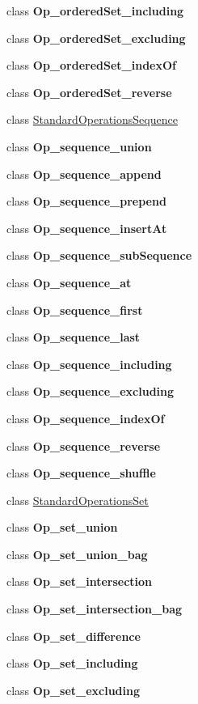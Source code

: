 \begin{DoxyCompactItemize}
class {\bfseries Op\-\_\-ordered\-Set\-\_\-including}
\item 
class {\bfseries Op\-\_\-ordered\-Set\-\_\-excluding}
\item 
class {\bfseries Op\-\_\-ordered\-Set\-\_\-index\-Of}
\item 
class {\bfseries Op\-\_\-ordered\-Set\-\_\-reverse}
\item 
class \hyperlink{classorg_1_1tzi_1_1use_1_1uml_1_1ocl_1_1expr_1_1operations_1_1_standard_operations_sequence}{Standard\-Operations\-Sequence}
\item 
class {\bfseries Op\-\_\-sequence\-\_\-union}
\item 
class {\bfseries Op\-\_\-sequence\-\_\-append}
\item 
class {\bfseries Op\-\_\-sequence\-\_\-prepend}
\item 
class {\bfseries Op\-\_\-sequence\-\_\-insert\-At}
\item 
class {\bfseries Op\-\_\-sequence\-\_\-sub\-Sequence}
\item 
class {\bfseries Op\-\_\-sequence\-\_\-at}
\item 
class {\bfseries Op\-\_\-sequence\-\_\-first}
\item 
class {\bfseries Op\-\_\-sequence\-\_\-last}
\item 
class {\bfseries Op\-\_\-sequence\-\_\-including}
\item 
class {\bfseries Op\-\_\-sequence\-\_\-excluding}
\item 
class {\bfseries Op\-\_\-sequence\-\_\-index\-Of}
\item 
class {\bfseries Op\-\_\-sequence\-\_\-reverse}
\item 
class {\bfseries Op\-\_\-sequence\-\_\-shuffle}
\item 
class \hyperlink{classorg_1_1tzi_1_1use_1_1uml_1_1ocl_1_1expr_1_1operations_1_1_standard_operations_set}{Standard\-Operations\-Set}
\item 
class {\bfseries Op\-\_\-set\-\_\-union}
\item 
class {\bfseries Op\-\_\-set\-\_\-union\-\_\-bag}
\item 
class {\bfseries Op\-\_\-set\-\_\-intersection}
\item 
class {\bfseries Op\-\_\-set\-\_\-intersection\-\_\-bag}
\item 
class {\bfseries Op\-\_\-set\-\_\-difference}
\item 
class {\bfseries Op\-\_\-set\-\_\-including}
\item 
class {\bfseries Op\-\_\-set\-\_\-excluding}

\end{DoxyCompactItemize}
